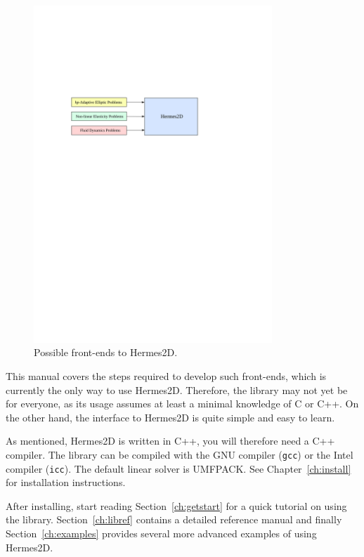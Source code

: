\begin{figure}[ht]
  \centering
  \medskip
  \includegraphics[width=0.8\textwidth]{img/frontends}
  \caption{Possible front-ends to Hermes2D.}
  \label{fig:frontends}
\end{figure}

This manual covers the steps required to develop such front-ends, which is currently
the only way to use Hermes2D. Therefore, the library may not yet be for everyone, as
its usage assumes at least a minimal knowledge of C or C++. On the other hand, the
interface to Hermes2D is quite simple and easy to learn.

As mentioned, Hermes2D is written in C++, you will therefore need a C++ compiler. The 
library can be compiled with the GNU compiler ({\tt gcc}) or the Intel compiler
({\tt icc}). The default linear solver is UMFPACK. See Chapter~\ref{ch:install} for
installation instructions.

After installing, start reading Section~\ref{ch:getstart} for a quick tutorial on
using the library. Section~\ref{ch:libref} contains a detailed reference
manual and finally Section~\ref{ch:examples} provides several more advanced examples
of using Hermes2D.
